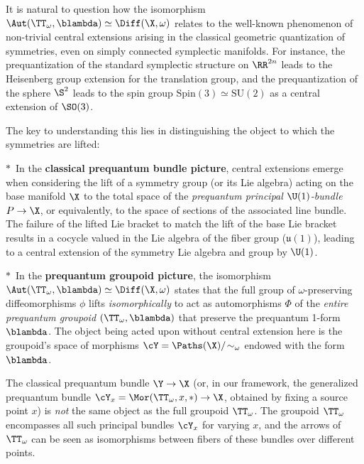   \begin{article}
    \label{art:Automorphism Group Extension} %
    
    It is natural to question how the isomorphism $\Aut(\TT_\omega, \blambda) \simeq \Diff(\X, \omega)$ relates to the well-known phenomenon of non-trivial central extensions arising in the classical geometric quantization of symmetries, even on simply connected symplectic manifolds.
    For instance,
    the prequantization of the standard symplectic structure on $\RR^{2n}$ leads to the Heisenberg group extension for the translation group,
    and the prequantization of the sphere $\S^2$ leads to the spin group $\mathrm{Spin}(3) \simeq \mathrm{SU}(2)$ as a central extension of $\SO(3)$.
    
    The key to understanding this lies in distinguishing the object to which the symmetries are lifted:
    
    $\ast$~In the \textbf{classical prequantum bundle picture},
    central extensions emerge when considering the lift of a symmetry group (or its Lie algebra) acting on the base manifold $\X$ to the total space of the \emph{prequantum principal $\U(1)$-bundle} $P \to \X$,
    or equivalently, to the space of sections of the associated line bundle. The failure of the lifted Lie bracket to match the lift of the base Lie bracket results in a cocycle valued in the Lie algebra of the fiber group ($\mathfrak{u}(1)$),
    leading to a central extension of the symmetry Lie algebra and group by $\U(1)$.
    
    $\ast$~In the \textbf{prequantum groupoid picture},
    the isomorphism $\Aut(\TT_\omega, \blambda) \simeq \Diff(\X, \omega)$ states that the full group of $\omega$-preserving diffeomorphisms $\phi$ lifts \emph{isomorphically} to act as automorphisms $\Phi$ of the \emph{entire prequantum groupoid} $(\TT_\omega, \blambda)$ that preserve the prequantum 1-form $\blambda$.
    The object being acted upon without central extension here is the groupoid's space of morphisms $\cY = \Paths(\X)/\!\sim_\omega$ endowed with the form $\blambda$.
    
    The classical prequantum bundle $\Y \to \X$
    (or, in our framework, the generalized prequantum bundle $\cY_x = \Mor(\TT_\omega, x, \ast) \to \X$, obtained by fixing a source point $x$)
    is \emph{not} the same object as the full groupoid $\TT_\omega$.
    The groupoid $\TT_\omega$ encompasses all such principal bundles $\cY_x$ for varying $x$,
    and the arrows of $\TT_\omega$ can be seen as isomorphisms between fibers of these bundles over different points.
    

\end{article}
